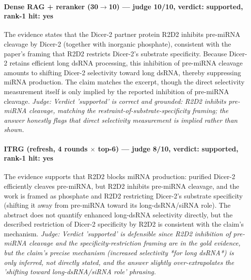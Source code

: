 \documentclass[sigconf, review, anonymous]{acmart}
\begin{document}
\paragraph{Dense RAG + reranker (30$\to$10) --- judge 10/10, verdict: supported, rank-1 hit: yes}
\noindent The evidence states that the Dicer-2 partner protein R2D2 inhibits pre-miRNA cleavage by Dicer-2 (together with inorganic phosphate), consistent with the paper's framing that R2D2 restricts Dicer-2's substrate specificity. Because Dicer-2 retains efficient long dsRNA processing, this inhibition of pre-miRNA cleavage amounts to shifting Dicer-2 selectivity toward long dsRNA, thereby suppressing miRNA production. The claim matches the excerpt, though the direct selectivity measurement itself is only implied by the reported inhibition of pre-miRNA cleavage.
\noindent\small\textit{Judge: Verdict 'supported' is correct and grounded: R2D2 inhibits pre-miRNA cleavage, matching the restraint-of-substrate-specificity framing; the answer honestly flags that direct selectivity measurement is implied rather than shown.}
\paragraph{ITRG (refresh, 4 rounds $\times$ top-6) --- judge 8/10, verdict: supported, rank-1 hit: yes}
\noindent The evidence supports that R2D2 blocks miRNA production: purified Dicer-2 efficiently cleaves pre-miRNA, but R2D2 inhibits pre-miRNA cleavage, and the work is framed as phosphate and R2D2 restricting Dicer-2's substrate specificity (shifting it away from pre-miRNA toward its long-dsRNA/siRNA role). The abstract does not quantify enhanced long-dsRNA selectivity directly, but the described restriction of Dicer-2 specificity by R2D2 is consistent with the claim's mechanism.
\noindent\small\textit{Judge: Verdict 'supported' is defensible since R2D2 inhibition of pre-miRNA cleavage and the specificity-restriction framing are in the gold evidence, but the claim's precise mechanism (increased selectivity *for long dsRNA*) is only inferred, not directly stated, and the answer slightly over-extrapolates the 'shifting toward long-dsRNA/siRNA role' phrasing.}
\end{document}
